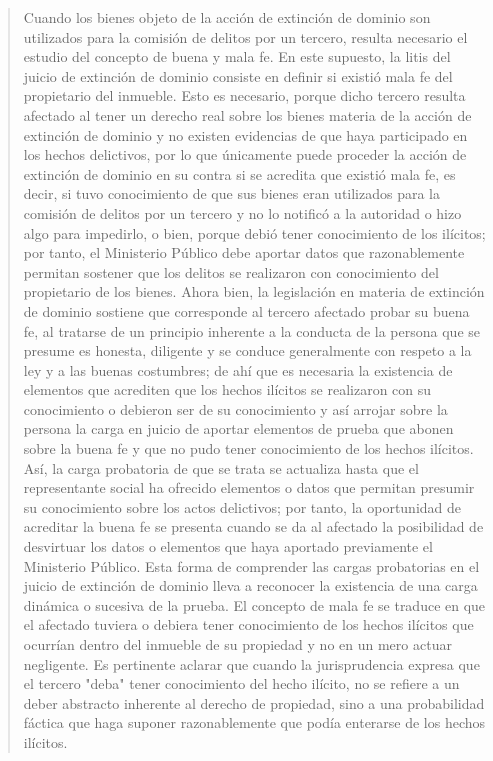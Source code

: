 \documentclass[11pt,a4paper]{article}
\begin{document}
\begin{quote}
Cuando los bienes objeto de la acción de extinción de dominio son utilizados para la comisión de
delitos por un tercero, resulta necesario el estudio del concepto de buena y mala fe. En este
supuesto, la litis del juicio de extinción de dominio consiste en definir si existió mala fe del
propietario del inmueble. Esto es necesario, porque dicho tercero resulta afectado al tener un
derecho real sobre los bienes materia de la acción de extinción de dominio y no existen evidencias
de que haya participado en los hechos delictivos, por lo que únicamente puede proceder la acción
de extinción de dominio en su contra si se acredita que existió mala fe, es decir, si tuvo
conocimiento de que sus bienes eran utilizados para la comisión de delitos por un tercero y no lo
notificó a la autoridad o hizo algo para impedirlo, o bien, porque debió tener conocimiento de los
ilícitos; por tanto, el Ministerio Público debe aportar datos que razonablemente permitan sostener
que los delitos se realizaron con conocimiento del propietario de los bienes. Ahora bien, la
legislación en materia de extinción de dominio sostiene que corresponde al tercero afectado probar
su buena fe, al tratarse de un principio inherente a la conducta de la persona que se presume es
honesta, diligente y se conduce generalmente con respeto a la ley y a las buenas costumbres; de
ahí que es necesaria la existencia de elementos que acrediten que los hechos ilícitos se realizaron
con su conocimiento o debieron ser de su conocimiento y así arrojar sobre la persona la carga en
juicio de aportar elementos de prueba que abonen sobre la buena fe y que no pudo tener
conocimiento de los hechos ilícitos. Así, la carga probatoria de que se trata se actualiza hasta que el
representante social ha ofrecido elementos o datos que permitan presumir su conocimiento sobre
los actos delictivos; por tanto, la oportunidad de acreditar la buena fe se presenta cuando se da al
afectado la posibilidad de desvirtuar los datos o elementos que haya aportado previamente el
Ministerio Público. Esta forma de comprender las cargas probatorias en el juicio de extinción de
dominio lleva a reconocer la existencia de una carga dinámica o sucesiva de la prueba. El concepto
de mala fe se traduce en que el afectado tuviera o debiera tener conocimiento de los hechos ilícitos
que ocurrían dentro del inmueble de su propiedad y no en un mero actuar negligente. Es pertinente
aclarar que cuando la jurisprudencia expresa que el tercero "deba" tener conocimiento del hecho
ilícito, no se refiere a un deber abstracto inherente al derecho de propiedad, sino a una probabilidad
fáctica que haga suponer razonablemente que podía enterarse de los hechos ilícitos.


\end{quote}
\end{document}
